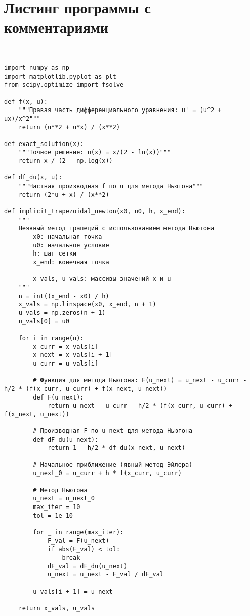 \documentclass[12pt,a4paper]{article}
\begin{document}
   \section{Листинг программы с комментариями}\\
   \begin{verbatim}
import numpy as np
import matplotlib.pyplot as plt
from scipy.optimize import fsolve

def f(x, u):
    """Правая часть дифференциального уравнения: u' = (u^2 + ux)/x^2"""
    return (u**2 + u*x) / (x**2)

def exact_solution(x):
    """Точное решение: u(x) = x/(2 - ln(x))"""
    return x / (2 - np.log(x))

def df_du(x, u):
    """Частная производная f по u для метода Ньютона"""
    return (2*u + x) / (x**2)

def implicit_trapezoidal_newton(x0, u0, h, x_end):
    """
    Неявный метод трапеций с использованием метода Ньютона
        x0: начальная точка
        u0: начальное условие
        h: шаг сетки
        x_end: конечная точка

        x_vals, u_vals: массивы значений x и u
    """
    n = int((x_end - x0) / h)
    x_vals = np.linspace(x0, x_end, n + 1)
    u_vals = np.zeros(n + 1)
    u_vals[0] = u0
    
    for i in range(n):
        x_curr = x_vals[i]
        x_next = x_vals[i + 1]
        u_curr = u_vals[i]
        
        # Функция для метода Ньютона: F(u_next) = u_next - u_curr - h/2 * (f(x_curr, u_curr) + f(x_next, u_next))
        def F(u_next):
            return u_next - u_curr - h/2 * (f(x_curr, u_curr) + f(x_next, u_next))
        
        # Производная F по u_next для метода Ньютона
        def dF_du(u_next):
            return 1 - h/2 * df_du(x_next, u_next)
        
        # Начальное приближение (явный метод Эйлера)
        u_next_0 = u_curr + h * f(x_curr, u_curr)
        
        # Метод Ньютона
        u_next = u_next_0
        max_iter = 10
        tol = 1e-10
        
        for _ in range(max_iter):
            F_val = F(u_next)
            if abs(F_val) < tol:
                break
            dF_val = dF_du(u_next)
            u_next = u_next - F_val / dF_val
        
        u_vals[i + 1] = u_next
    
    return x_vals, u_vals


\end{verbatim}
\end{document}
